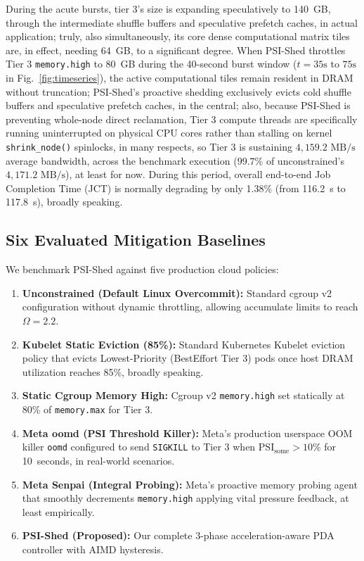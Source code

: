 \documentclass[pdflatex,sn-mathphys,Numbered]{sn-jnl}
\begin{document}
During the acute bursts, tier 3's size is expanding speculatively to 140~GB, through the intermediate shuffle buffers and speculative prefetch caches, in actual application; truly, also simultaneously, its core dense computational matrix tiles are, in effect, needing 64~GB, to a significant degree. When PSI-Shed throttles Tier 3 \texttt{memory.high} to 80~GB during the 40-second burst window ($t = 35\text{s}$ to $75\text{s}$ in Fig.~\ref{fig:timeseries}), the active computational tiles remain resident in DRAM without truncation; PSI-Shed's proactive shedding exclusively evicts cold shuffle buffers and speculative prefetch caches, in the central; also, because PSI-Shed is preventing whole-node direct reclamation, Tier 3 compute threads are specifically running uninterrupted on physical CPU cores rather than stalling on kernel \texttt{shrink\_node()} spinlocks, in many respects, so Tier 3 is sustaining $4,159.2\text{ MB/s}$ average bandwidth, across the benchmark execution ($99.7\%$ of unconstrained's $4,171.2\text{ MB/s}$), at least for now. During this period, overall end-to-end Job Completion Time (JCT) is normally degrading by only 1.38\% (from 116.2~s to 117.8~s), broadly speaking.

\subsection{Six Evaluated Mitigation Baselines}
We benchmark PSI-Shed against five production cloud policies:
\begin{enumerate}
    \item \textbf{Unconstrained (Default Linux Overcommit):} Standard cgroup v2 configuration without dynamic throttling, allowing accumulate limits to reach $\Omega = 2.2$.
    \item \textbf{Kubelet Static Eviction (85\%):} Standard Kubernetes Kubelet eviction policy \cite{k8s2023eviction} that evicts Lowest-Priority (BestEffort Tier 3) pods once host DRAM utilization reaches 85\%, broadly speaking.
    \item \textbf{Static Cgroup Memory High:} Cgroup v2 \texttt{memory.high} set statically at 80\% of \texttt{memory.max} for Tier 3.
    \item \textbf{Meta oomd (PSI Threshold Killer):} Meta's production userspace OOM killer \texttt{oomd} \cite{heo2018oomd} configured to send \texttt{SIGKILL} to Tier 3 when $\text{PSI}_{\text{some}} > 10\%$ for 10~seconds, in real-world scenarios.
    \item \textbf{Meta Senpai (Integral Probing):} Meta's proactive memory probing agent \cite{yang2021senpai} that smoothly decrements \texttt{memory.high} applying vital pressure feedback, at least empirically.
    \item \textbf{PSI-Shed (Proposed):} Our complete 3-phase acceleration-aware PDA controller with AIMD hysteresis.
\end{enumerate}
\end{document}
